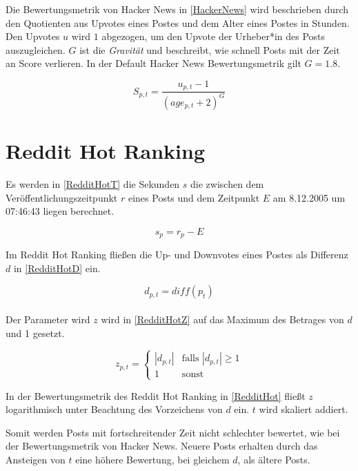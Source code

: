 Die Bewertungsmetrik von Hacker News in \ref{HackerNews} wird beschrieben durch den Quotienten aus Upvotes eines Postes und dem Alter eines Postes in Stunden. Den Upvotes $u$ wird $1$ abgezogen, um den Upvote der Urheber*in des Posts auszugleichen. $G$ ist die \textit{Gravität} und beschreibt, wie schnell Posts mit der Zeit an Score verlieren. In der Default Hacker News Bewertungsmetrik gilt $G = 1.8$.

\begin{equation}
\label{HackerNews}
S_{p,t} = \frac{u_{p,t} - 1}{(age_{p,t} + 2)^{G}}
\end{equation}


\section{Reddit Hot Ranking}

Es werden in \ref{RedditHotT} die Sekunden $s$ die zwischen dem Veröffentlichungszeitpunkt $r$ eines Posts und dem Zeitpunkt $E$ am 8.12.2005 um 07:46:43 liegen berechnet.

\begin{equation}
\label{RedditHotT}
s_{p} = r_{p} - E  
\end{equation}

Im Reddit Hot Ranking fließen die Up- und Downvotes eines Postes als Differenz $d$ in \ref{RedditHotD} ein.  

\begin{equation}
\label{RedditHotD}
d_{p,t} = diff(p_t)
\end{equation}
\\
Der Parameter wird $z$ wird in \ref{RedditHotZ} auf das Maximum des Betrages von $d$ und 1 gesetzt.

\begin{equation}
\label{RedditHotZ}
z_{p,t}  = \begin{cases}
|d_{p,t}| &\text{falls $|d_{p,t}| \geq 1$}\\
1 &\text{sonst}
\end{cases}
\end{equation}

In der Bewertungsmetrik des Reddit Hot Ranking in \ref{RedditHot} fließt $z$ logarithmisch unter Beachtung des Vorzeichens von $d$ ein. $t$ wird skaliert addiert.

Somit werden Posts mit fortschreitender Zeit nicht schlechter bewertet, wie bei der Bewertungsmetrik von Hacker News. Neuere Posts erhalten durch das Ansteigen von $t$ eine höhere Bewertung, bei gleichem $d$, als ältere Posts.  


